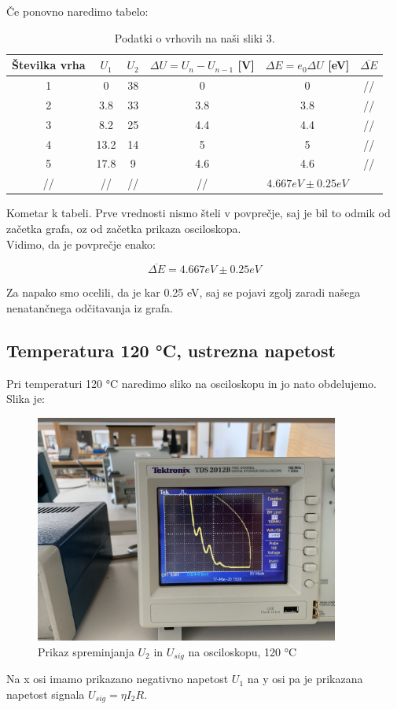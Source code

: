 \documentclass[11pt, a4paper]{article}
\theoremstyle{definition}
\theoremstyle{example}
\theoremstyle{izrek}
\begin{document}
Če ponovno naredimo tabelo: 
\begin{table}[h]
	\centering
	\begin{tabular}{|c|c|c|c|c|c|}
		\hline
		
		Številka vrha & $U_1$ & $U_2$& $\Delta U = U_{n}- U_{n-1}$ [V] & $\Delta E= e_0\Delta U $ [eV] & $\overline{\Delta E}$\\
		\hline
		\hline
		1 & 0 & 38 & 0 & 0 & //\\
		\hline
		2 & 3.8 & 33 & 3.8 & 3.8 &// \\
		\hline
		3 & 8.2 & 25 & 4.4 & 4.4 & //\\
		\hline
		4 & 13.2 & 14 & 5 & 5 & //\\
		\hline
		5 & 17.8 & 9 & 4.6 & 4.6 &//\\
		\hline
		//& //& //&// & $4.667 eV \pm 0.25 eV$\\ 
		\hline
		\hline
	\end{tabular}
	\caption{Podatki o vrhovih na naši sliki 3.}		\label{140 °C}
\end{table}
Kometar k tabeli. Prve vrednosti nismo šteli v povprečje, saj je bil to odmik od začetka grafa, oz od začetka prikaza osciloskopa. \\
Vidimo, da je povprečje enako: 

$$\overline{\Delta E}=4.667 eV \pm 0.25 eV$$

Za napako smo ocelili, da je kar 0.25 eV, saj se pojavi zgolj zaradi našega nenatančnega odčitavanja iz grafa.

\pagebreak
\subsection{Temperatura 120 °C, ustrezna napetost}
Pri temperaturi 120 °C naredimo sliko na osciloskopu in jo nato obdelujemo. Slika je: 

\begin{figure}[H]
    \centering
    \includegraphics[width=10cm]{T=120_ustrezna_napetost.jpg}
    \caption{Prikaz spreminjanja $U_2$ in $U_{sig}$ na osciloskopu, 120 °C}
\end{figure}
Na x osi imamo prikazano negativno napetost $U_1$ na y osi pa je prikazana napetost signala $U_{sig}=\eta I_2 R.$
\end{document}
